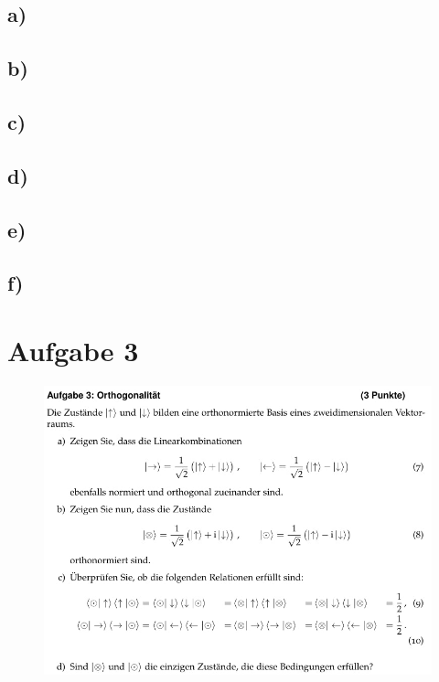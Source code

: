     \subsection{a)}

    \subsection{b)}

    \subsection{c)}

    \subsection{d)}

    \subsection{e)}

    \subsection{f)}


\section{Aufgabe 3}

    \begin{figure}[H]
        \centering
        \includegraphics[width=\textwidth]{images/Aufgabe3.jpg}
        \label{fig:4}
    \end{figure}

